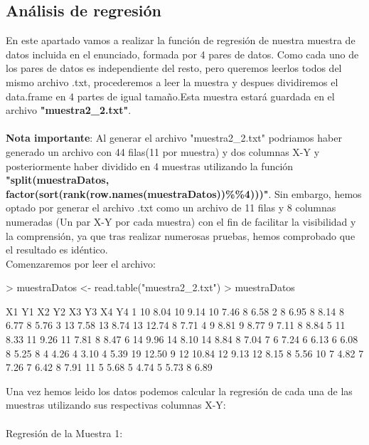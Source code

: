 \documentclass [a4paper] {article}
\begin{document}
\subsection{Análisis de regresión}
En este apartado vamos a realizar la función de regresión de nuestra muestra de datos incluida en el enunciado, formada por 4 pares 
de datos. Como cada uno de los pares de datos es independiente del resto, pero queremos leerlos todos del mismo archivo .txt,
procederemos a leer la muestra y despues dividiremos el data.frame en 4 partes de igual tamaño.Esta muestra estará guardada
en el archivo \textbf{"muestra2\_2.txt"}.\\\\
\textbf{Nota importante}: Al generar el archivo "muestra2\_2.txt" podriamos haber generado un archivo con 44 filas(11 por muestra) y dos
columnas X-Y y posteriormente haber dividido en 4 muestras utilizando la función 
\textbf{"split(muestraDatos, factor(sort(rank(row.names(muestraDatos))\%\%4)))"}. Sin embargo, hemos optado por generar el archivo
.txt como un archivo de 11 filas y 8 columnas numeradas (Un par X-Y por cada muestra) con el fin de facilitar la visibilidad y la
comprensión, ya que tras realizar numerosas pruebas, hemos comprobado que el resultado es idéntico.\\
Comenzaremos por leer el archivo:

\begin{Schunk}
\begin{Sinput}
> muestraDatos <- read.table("muestra2_2.txt")
> muestraDatos
\end{Sinput}
\begin{Soutput}
   X1    Y1 X2   Y2 X3    Y3 X4    Y4
1  10  8.04 10 9.14 10  7.46  8  6.58
2   8  6.95  8 8.14  8  6.77  8  5.76
3  13  7.58 13 8.74 13 12.74  8  7.71
4   9  8.81  9 8.77  9  7.11  8  8.84
5  11  8.33 11 9.26 11  7.81  8  8.47
6  14  9.96 14 8.10 14  8.84  8  7.04
7   6  7.24  6 6.13  6  6.08  8  5.25
8   4  4.26  4 3.10  4  5.39 19 12.50
9  12 10.84 12 9.13 12  8.15  8  5.56
10  7  4.82  7 7.26  7  6.42  8  7.91
11  5  5.68  5 4.74  5  5.73  8  6.89
\end{Soutput}
\end{Schunk}

Una vez hemos leido los datos podemos calcular la regresión de cada una de las muestras utilizando sus respectivas columnas X-Y:\\\\
Regresión de la Muestra 1:
\end{document}
